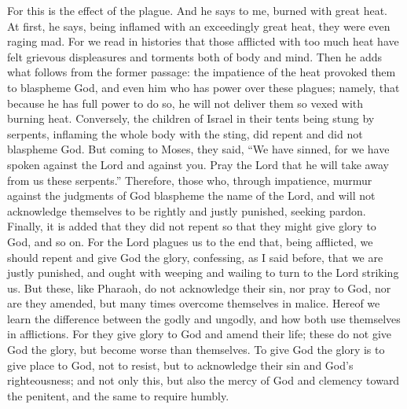 For this is the effect of the plague. And he says to me, burned with great heat. At first, he says, being inflamed with an exceedingly great heat, they were even raging mad. For we read in histories that those afflicted with too much heat have felt grievous displeasures and torments both of body and mind. Then he adds what follows from the former passage: the impatience of the heat provoked them to blaspheme God, and even him who has power over these plagues; namely, that because he has full power to do so, he will not deliver them so vexed with burning heat. Conversely, the children of Israel in their tents being stung by serpents, inflaming the whole body with the sting, did repent and did not blaspheme God. But coming to Moses, they said, “We have sinned, for we have spoken against the Lord and against you. Pray the Lord that he will take away from us these serpents.” Therefore, those who, through impatience, murmur against the judgments of God blaspheme the name of the Lord, and will not acknowledge themselves to be rightly and justly punished, seeking pardon. Finally, it is added that they did not repent so that they might give glory to God, and so on. For the Lord plagues us to the end that, being afflicted, we should repent and give God the glory, confessing, as I said before, that we are justly punished, and ought with weeping and wailing to turn to the Lord striking us. But these, like Pharaoh, do not acknowledge their sin, nor pray to God, nor are they amended, but many times overcome themselves in malice. Hereof we learn the difference between the godly and ungodly, and how both use themselves in afflictions. For they give glory to God and amend their life; these do not give God the glory, but become worse than themselves. To give God the glory is to give place to God, not to resist, but to acknowledge their sin and God’s righteousness; and not only this, but also the mercy of God and clemency toward the penitent, and the same to require humbly.

